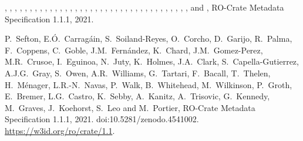 \documentclass[ds,v1.1.2,openaccess]{iosart2x}%
\begin{document}
\begin{thebibliography}{}
%
\begin{botherref}
,
,
,
,
,
,
,
,
,
,
,
,
,
,
,
,
,
,
,
,
,
,
,
,
,
,
,
,
,
,
,
,
,
,
,
,
,
 and
,
{RO}-Crate Metadata Specification 1.1.1,
2021.
\end{botherref}
%
\OrigBibText
P.~Sefton,
E.{\'{O}}.~Carrag\'{a}in,
S.~Soiland-Reyes,
O.~Corcho,
D.~Garijo,
R.~Palma,
F.~Coppens,
C.~Goble,
J.M.~Fern\'{a}ndez,
K.~Chard,
J.M.~Gomez-Perez,
M.R.~Crusoe,
I.~Eguinoa,
N.~Juty,
K.~Holmes,
J.A.~Clark,
S.~Capella-Gutierrez,
A.J.G.~Gray,
S.~Owen,
A.R.~Williams,
G.~Tartari,
F.~Bacall,
T.~Thelen,
H.~M\'{e}nager,
L.R.-N.~Navas,
P.~Walk,
B.~Whitehead,
M.~Wilkinson,
P.~Groth,
E.~Bremer,
L.G.~Castro,
K.~Sebby,
A.~Kanitz,
A.~Trisovic,
G.~Kennedy,
M.~Graves,
J.~Koehorst,
S.~Leo and
M.~Portier,
{RO}-Crate Metadata Specification 1.1.1,
2021.
doi:10.5281/zenodo.4541002.
\url{https://w3id.org/ro/crate/1.1}.
\endOrigBibText
{}
\endbibitem


\end{thebibliography}
\end{document}
